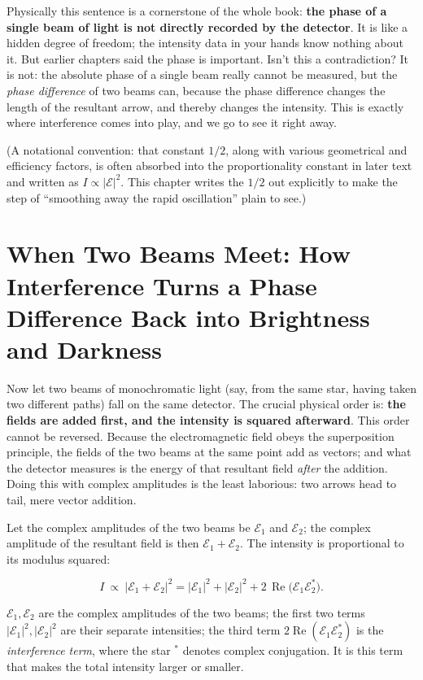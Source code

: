 Physically this sentence is a cornerstone of the whole book: \textbf{the phase of a single beam of light is not directly recorded by the detector}. It is like a hidden degree of freedom; the intensity data in your hands know nothing about it. But earlier chapters said the phase is important. Isn't this a contradiction? It is not: the absolute phase of a single beam really cannot be measured, but the \emph{phase difference} of two beams can, because the phase difference changes the length of the resultant arrow, and thereby changes the intensity. This is exactly where interference comes into play, and we go to see it right away.

(A notational convention: that constant \(1/2\), along with various geometrical and efficiency factors, is often absorbed into the proportionality constant in later text and written as \(I\propto|\mathcal E|^2\). This chapter writes the \(1/2\) out explicitly to make the step of ``smoothing away the rapid oscillation'' plain to see.)

\section{When Two Beams Meet: How Interference Turns a Phase Difference Back into Brightness and Darkness}
\label{sec:e01-interference}

Now let two beams of monochromatic light (say, from the same star, having taken two different paths) fall on the same detector. The crucial physical order is: \textbf{the fields are added first, and the intensity is squared afterward}. This order cannot be reversed. Because the electromagnetic field obeys the superposition principle, the fields of the two beams at the same point add as vectors; and what the detector measures is the energy of that resultant field \emph{after} the addition. Doing this with complex amplitudes is the least laborious: two arrows head to tail, mere vector addition.

Let the complex amplitudes of the two beams be \(\mathcal E_1\) and \(\mathcal E_2\); the complex amplitude of the resultant field is then \(\mathcal E_1+\mathcal E_2\). The intensity is proportional to its modulus squared:

\begin{equation}
  I\ \propto\ |\mathcal E_1+\mathcal E_2|^2
  =|\mathcal E_1|^2+|\mathcal E_2|^2+2\,\operatorname{Re}\!\bigl(\mathcal E_1\mathcal E_2^{\ast}\bigr).
  \label{eq:e01-interference}
\end{equation}
\begin{formulaexplain}
\(\mathcal E_1,\mathcal E_2\) are the complex amplitudes of the two beams; the first two terms \(|\mathcal E_1|^2,|\mathcal E_2|^2\) are their separate intensities; the third term \(2\operatorname{Re}(\mathcal E_1\mathcal E_2^{\ast})\) is the \emph{interference term}, where the star \({}^\ast\) denotes complex conjugation. It is this term that makes the total intensity larger or smaller.
\end{formulaexplain}


